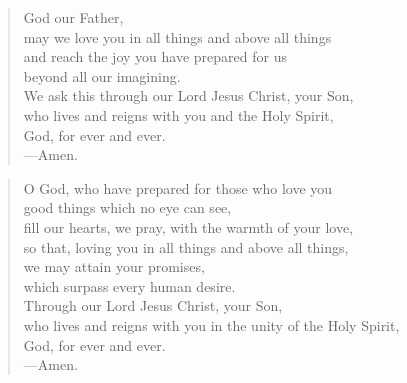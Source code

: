 \prayer

\setlength{\leftmargini}{\prayerleftmargini}

\begin{verse}
God our Father,\\
may we love you in all things and above all things\\
and reach the joy you have prepared for us\\
beyond all our imagining.\\
We ask this through our Lord Jesus Christ, your Son,\\
who lives and reigns with you and the Holy Spirit,\\
God, for ever and ever.\\
{\color{red}---\thinspace}Amen.
\end{verse}


\begin{verse}
O God, who have prepared for those who love you\\
good things which no eye can see,\\
fill our hearts, we pray, with the warmth of your love,\\
so that, loving you in all things and above all things,\\
we may attain your promises,\\
which surpass every human desire.\\
Through our Lord Jesus Christ, your Son,\\
who lives and reigns with you in the unity of the Holy Spirit,\\
God, for ever and ever.\\
{\color{red}---\thinspace}Amen.
\end{verse}

\setlength{\leftmargini}{\defleftmargini}